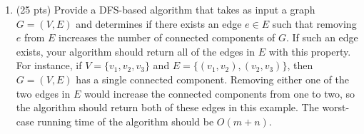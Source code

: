 \documentclass{article}
\begin{document}
\begin{enumerate}
\item (25 pts) Provide a DFS-based algorithm that takes as input a graph $G=(V,E)$ and determines if there exists an edge $e\in E$ such that removing $e$ from $E$ increases the number of connected components of $G$. If such an edge exists, your algorithm should return all of the edges in $E$ with this property. For instance, if $V=\{v_1, v_2, v_3\}$ and $E=\{(v_1, v_2), (v_2, v_3)\}$, then $G=(V,E)$ has a single connected component. Removing either one of the two edges in $E$ would increase the connected components from one to two, so the algorithm should return both of these edges in this example. The worst-case running time of the algorithm should be $O(m+n)$.

\end{enumerate}
\end{document}

